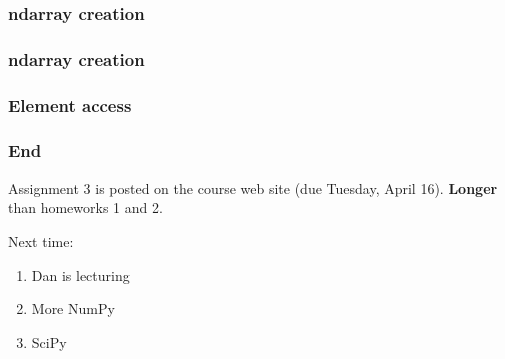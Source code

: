 \documentclass{beamer}
\begin{document}
\begin{frame}
\frametitle{ndarray creation}
\end{frame}

\begin{frame}
\frametitle{ndarray creation}
\end{frame}

\begin{frame}
\frametitle{Element access}
\end{frame}

\begin{frame}
\frametitle{End}

Assignment 3 is posted on the course web site (due Tuesday, April 16).  \textbf{Longer} than homeworks 1 and 2.

\vspace{0.2in}

Next time:
\begin{enumerate}
\setlength{\itemsep}{0.05in}
\item{Dan is lecturing}
\item{More NumPy}
\item{SciPy}
\end{enumerate}

\end{frame}
\end{document}
